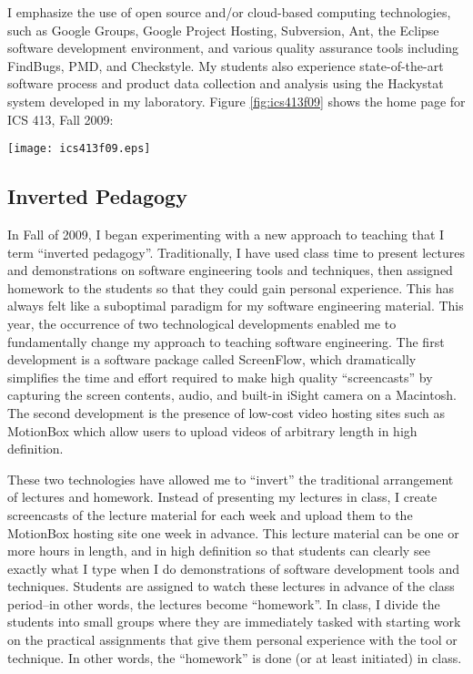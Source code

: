 \documentclass[11pt]{article}
\begin{document}
I emphasize the use of open source and/or cloud-based computing
technologies, such as Google Groups, Google Project Hosting, Subversion,
Ant, the Eclipse software development environment, and various quality
assurance tools including FindBugs, PMD, and Checkstyle.  My students also
experience state-of-the-art software process and product data collection
and analysis using the Hackystat system developed in my laboratory.  Figure
\ref{fig:ics413f09} shows the home page for ICS 413, Fall 2009:

 \begin{figure*}[ht]
  \center
  \texttt{[image: ics413f09.eps]}
  \caption{ICS 413, Fall 2009 Home Page}
  \label{fig:ics413f09}
\end{figure*}  

\subsection{Inverted Pedagogy}

In Fall of 2009, I began experimenting with a new approach to teaching that
I term ``inverted pedagogy''.  Traditionally, I have used class time to
present lectures and demonstrations on software engineering tools and
techniques, then assigned homework to the students so that they could gain
personal experience.  This has always felt like a suboptimal paradigm for
my software engineering material.  This year, the occurrence of two
technological developments enabled me to fundamentally change my approach
to teaching software engineering. The first development is a software
package called ScreenFlow, which dramatically simplifies the time and
effort required to make high quality ``screencasts'' by capturing the
screen contents, audio, and built-in iSight camera on a Macintosh.  The
second development is the presence of low-cost  video
hosting sites such as MotionBox which allow users to upload videos of
arbitrary length in high definition.  

These two technologies have allowed me to ``invert'' the traditional
arrangement of lectures and homework.  Instead of presenting my lectures in
class, I create screencasts of the lecture material for each week and
upload them to the MotionBox hosting site one week in advance.  This
lecture material can be one or more hours in length, and in high definition
so that students can clearly see exactly what I type when I do demonstrations of
software development tools and techniques.  Students are assigned to watch
these lectures in advance of the class period--in other words, the lectures
become ``homework''.   In class, I divide the students into small groups
where they are immediately tasked with starting work on the practical
assignments that give them personal experience with the tool or technique.
In other words, the ``homework'' is done (or at least initiated)  in class.
\end{document}
